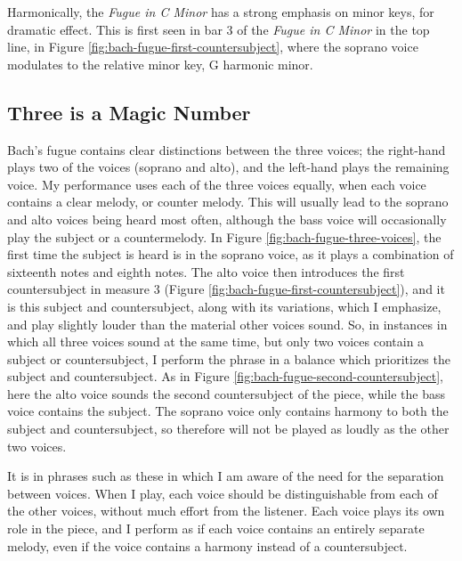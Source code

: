Harmonically, the \textit{Fugue in C Minor} has a strong emphasis on minor keys, for dramatic effect. This is first seen in bar 3 of the \textit{Fugue in C Minor} in the top line, in Figure \ref{fig:bach-fugue-first-countersubject}\autocite{Henle_2009}, where the soprano voice modulates to the relative minor key, G harmonic minor. 

\subsection{Three is a Magic Number}

Bach's fugue contains clear distinctions between the three voices; the right-hand plays two of the voices (soprano and alto), and the left-hand plays the remaining voice. My performance uses each of the three voices equally, when each voice contains a clear melody, or counter melody. This will usually lead to the soprano and alto voices being heard most often, although the bass voice will occasionally play the subject or a countermelody. In Figure \ref{fig:bach-fugue-three-voices}\autocite{Henle_2009}, the first time the subject is heard is in the soprano voice, as it plays a combination of sixteenth notes and eighth notes. The alto voice then introduces the first countersubject in measure 3 (Figure \ref{fig:bach-fugue-first-countersubject}\autocite{Henle_2009}), and it is this subject and countersubject, along with its variations, which I emphasize, and play slightly louder than the material other voices sound. So, in instances in which all three voices sound at the same time, but only two voices contain a subject or countersubject, I perform the phrase in a balance which prioritizes the subject and countersubject. As in Figure \ref{fig:bach-fugue-second-countersubject}\autocite{Henle_2009}, here the alto voice sounds the second countersubject of the piece, while the bass voice contains the subject. The soprano voice only contains harmony to both the subject and countersubject, so therefore will not be played as loudly as the other two voices. 

It is in phrases such as these in which I am aware of the need for the separation between voices. When I play, each voice should be distinguishable from each of the other voices, without much effort from the listener. Each voice plays its own role in the piece, and I perform as if each voice contains an entirely separate melody, even if the voice contains a harmony instead of a countersubject. 

